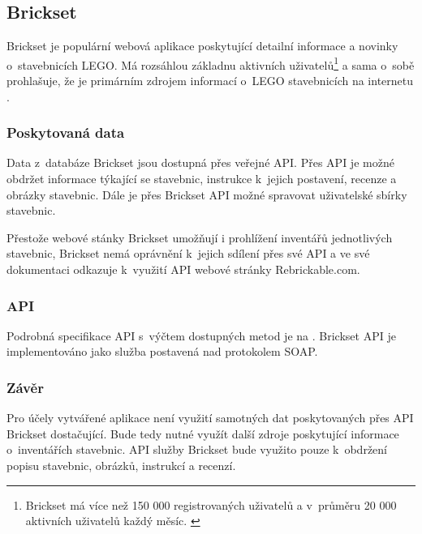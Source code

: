 \subsection{Brickset}\label{reserse-brickset}
  Brickset je populární webová aplikace poskytující detailní informace a novinky o~stavebnicích LEGO. Má rozsáhlou základnu aktivních uživatelů\footnote{Brickset má více než 150 000 registrovaných uživatelů a v~průměru 20 000 aktivních uživatelů každý měsíc. \autocite{brickset:infographic}} a sama o~sobě prohlašuje, že je primárním zdrojem informací o~LEGO stavebnicích na internetu \autocite{brickset:about}.

  \subsubsection*{Poskytovaná data}
  Data z~databáze Brickset jsou dostupná přes veřejné \gls{API}. Přes \gls{API} je možné obdržet informace týkající se stavebnic, instrukce k~jejich postavení, recenze a obrázky stavebnic. Dále je přes Brickset \gls{API} možné spravovat uživatelské sbírky stavebnic. 

  Přestože webové stánky Brickset umožňují i prohlížení inventářů jednotlivých stavebnic, Brickset nemá oprávnění k~jejich sdílení přes své   \gls{API} a ve své dokumentaci \autocite{brickset:api} odkazuje k~využití \gls{API} webové stránky Rebrickable.com. 

  \subsubsection*{API}
  Podrobná specifikace \gls{API} s~výčtem dostupných metod je na \autocite{brickset:api}. Brickset \gls{API} je implementováno jako služba postavená nad protokolem \gls{SOAP}. 

  \subsubsection*{Závěr}
  Pro účely vytvářené aplikace není využití samotných dat poskytovaných přes \gls{API} Brickset dostačující. Bude tedy nutné využít další zdroje poskytující informace o~inventářích stavebnic. \gls{API} služby Brickset bude využito pouze k~obdržení popisu stavebnic, obrázků, instrukcí a recenzí.